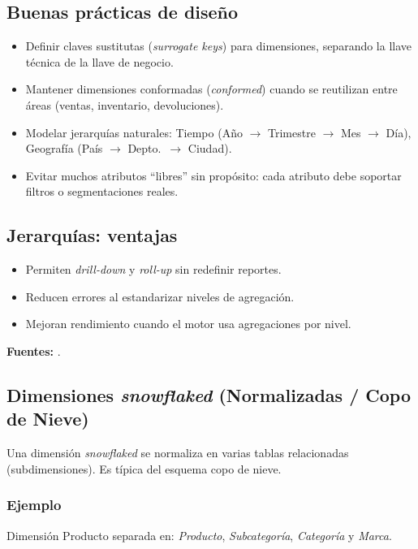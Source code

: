 \documentclass[12pt]{article}
\begin{document}
\subsection*{Buenas prácticas de diseño}
\begin{itemize}[leftmargin=*, itemsep=0.25em]
  \item Definir claves sustitutas (\textit{surrogate keys}) para dimensiones, separando la llave técnica de la llave de negocio.
  \item Mantener dimensiones conformadas (\textit{conformed}) cuando se reutilizan entre áreas (ventas, inventario, devoluciones).
  \item Modelar jerarquías naturales: Tiempo (Año \(\rightarrow\) Trimestre \(\rightarrow\) Mes \(\rightarrow\) Día), Geografía (País \(\rightarrow\) Depto.\ \(\rightarrow\) Ciudad).
  \item Evitar muchos atributos ``libres'' sin propósito: cada atributo debe soportar filtros o segmentaciones reales.
\end{itemize}

\subsection*{Jerarquías: ventajas}
\begin{itemize}[leftmargin=*, itemsep=0.25em]
  \item Permiten \textit{drill-down} y \textit{roll-up} sin redefinir reportes.
  \item Reducen errores al estandarizar niveles de agregación.
  \item Mejoran rendimiento cuando el motor usa agregaciones por nivel.
\end{itemize}

\noindent\textbf{Fuentes:} \cite{kimballgroup_star_olap, ibm_what_is_olap}.

\subsection*{Dimensiones \textit{snowflaked} (Normalizadas / Copo de Nieve)}
Una dimensión \textit{snowflaked} se normaliza en varias tablas relacionadas (subdimensiones). Es típica del esquema copo de nieve.

\subsubsection*{Ejemplo}
Dimensión Producto separada en: \textit{Producto}, \textit{Subcategoría}, \textit{Categoría} y \textit{Marca}.
\end{document}
